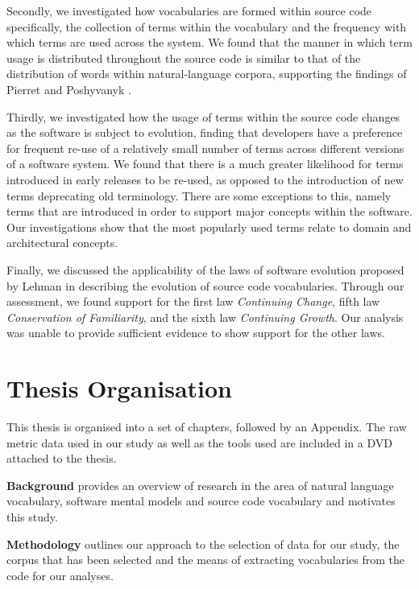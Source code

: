 Secondly, we investigated how vocabularies are formed within source code specifically, the collection of terms within the vocabulary and the frequency with which terms are used across the system. We found that the manner in which term usage is distributed throughout the source code is similar to that of the distribution of words within natural-language corpora, supporting the findings of Pierret and Poshyvanyk \cite{Pierret09a}.

Thirdly, we investigated how the usage of terms within the source code changes as the software is subject to evolution, finding that developers have a preference for frequent re-use of a relatively small number of terms across different versions of a software system. We found that there is a much greater likelihood for terms introduced in early releases to be re-used, as opposed to the introduction of new terms deprecating old terminology. There are some exceptions to this, namely terms that are introduced in order to support major concepts within the software. Our investigations show that the most popularly used terms relate to domain and architectural concepts.

Finally, we discussed the applicability of the laws of software evolution proposed by Lehman \cite{Lehman80a,Lehman97a} in describing the evolution of source code vocabularies. Through our assessment, we found support for the first law \emph{Continuing Change}, fifth law \emph{Conservation of Familiarity}, and the sixth law \emph{Continuing Growth}. Our analysis was unable to provide sufficient evidence to show support for the other laws.



\section{Thesis Organisation} %
\label{sec:thesis_organisation}

This thesis is organised into a set of chapters, followed by an Appendix. The raw metric data used in our study as well as the tools used are included in a DVD attached to the thesis.

\textbf{Background} provides an overview of research in the area of natural language vocabulary, software mental models and source code vocabulary and motivates this study.

\textbf{Methodology} outlines our approach to the selection of data for our study, the corpus that has been selected and the means of extracting vocabularies from the code for our analyses.

